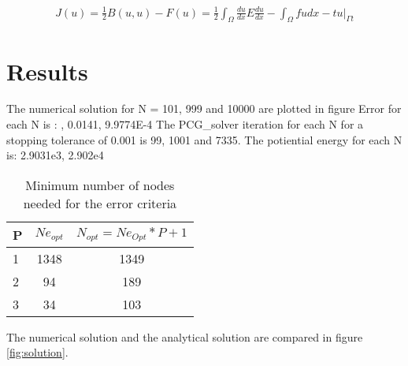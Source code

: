 \documentclass[paper=a4, fontsize=11pt]{article} %
\begin{document}
\begin{eqnarray}
J(u) = \frac{1}{2} B(u, u) - F(u) = \frac{1}{2} \int_{\Omega} \frac{du}{dx} E \frac{du}{dx} - \int_{\Omega} fu dx - tu |_{\Gamma t}
\end{eqnarray}


\section{Results}

The numerical solution for N = 101, 999 and 10000 are plotted in figure
Error for each N is : , 0.0141, 9.9774E-4
The PCG_solver iteration for each N for a stopping tolerance of 0.001 is 99, 1001 and  7335.
The potiential energy for each N is: 2.9031e3, 2.902e4

\begin{table}
\begin{center}
  \begin{tabular}{ l | c | c}
    \hline
    P & $Ne_{opt}$ & $N_{opt} = Ne_{Opt} * P + 1 $\\ \hline
    1 & 1348 & 1349\\ \hline
    2 &  94 & 189\\ \hline
    3 & 34 & 103\\ \hline
    \hline
  \end{tabular}
  \caption{Minimum number of nodes needed for the error criteria}
\end{center}
\end{table}

The numerical solution and the analytical solution are compared in figure \ref{fig:solution}. 


        
\end{document}
